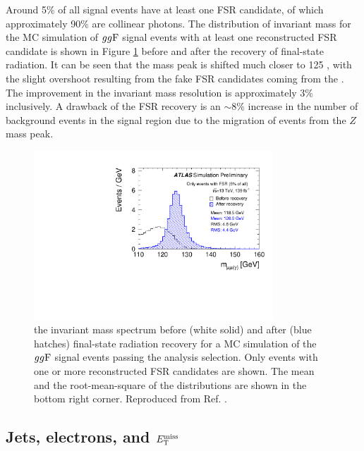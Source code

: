 Around 5\% of all signal events have at least one FSR candidate,
of which approximately 90\% are collinear photons.
The distribution of invariant mass for the MC simulation of
$gg\text{F}$ signal events with at least one reconstructed FSR
candidate is shown in Figure \ref{fig:hmumu:fsr}
before and after the recovery of final-state radiation.
It can be seen that the mass peak is shifted much closer to
125 \GeV, with the slight overshoot resulting from the fake
FSR candidates coming from the \pileup. The improvement in the
invariant mass resolution is approximately 3\% inclusively.
A drawback of the FSR recovery is an $\sim 8\%$ increase in the
number of background events in the signal region due to the
migration of events from the $Z$ mass peak.
\begin{figure}[h!]
  \centering
  \includegraphics[width=0.8\textwidth]{figures/hmumu/FSR_fsr}
  \caption[Final state radiation recovery]{the invariant mass spectrum before
  (white solid) and after (blue hatches) final-state radiation
  recovery for a MC simulation of the $gg\text{F}$ signal events passing
  the analysis selection. Only events with one or more
  reconstructed FSR candidates are shown. The mean and the
  root-mean-square of the distributions are shown in the bottom
  right corner. Reproduced from Ref. \cite{ATLAS-CONF-2019-028}.}
  \label{fig:hmumu:fsr}
\end{figure}

\subsection{Jets, electrons, and $E_\text{T}^\text{miss}$}

